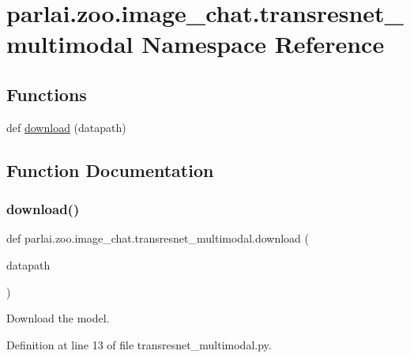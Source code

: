 \hypertarget{namespaceparlai_1_1zoo_1_1image__chat_1_1transresnet__multimodal}{}\section{parlai.\+zoo.\+image\+\_\+chat.\+transresnet\+\_\+multimodal Namespace Reference}
\label{namespaceparlai_1_1zoo_1_1image__chat_1_1transresnet__multimodal}
\subsection*{Functions}
\begin{DoxyCompactItemize}
\item 
def \hyperlink{namespaceparlai_1_1zoo_1_1image__chat_1_1transresnet__multimodal_a07b4f0a9e7658b5b5599d6d71bc08f2a}{download} (datapath)
\end{DoxyCompactItemize}


\subsection{Function Documentation}
\mbox{\label{namespaceparlai_1_1zoo_1_1image__chat_1_1transresnet__multimodal_a07b4f0a9e7658b5b5599d6d71bc08f2a}} 
\subsubsection{\texorpdfstring{download()}{download()}}
{\footnotesize\ttfamily def parlai.\+zoo.\+image\+\_\+chat.\+transresnet\+\_\+multimodal.\+download (\begin{DoxyParamCaption}\item[{}]{datapath }\end{DoxyParamCaption})}

\begin{DoxyVerb}Download the model.
\end{DoxyVerb}
 

Definition at line 13 of file transresnet\+\_\+multimodal.\+py.


